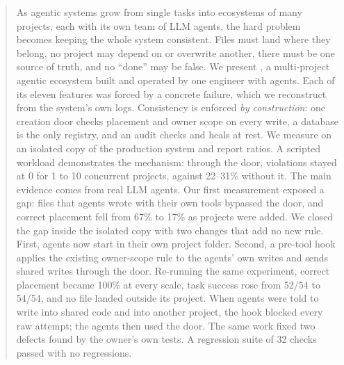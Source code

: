 \begin{abstract}
As agentic systems grow from single tasks into ecosystems of many projects, each with its own team of LLM agents, the hard problem becomes keeping the whole system consistent. Files must land where they belong, no project may depend on or overwrite another, there must be one source of truth, and no ``done'' may be false. We present \sys{}, a multi-project agentic ecosystem built and operated by one engineer with agents. Each of its eleven features was forced by a concrete failure, which we reconstruct from the system's own logs. Consistency is enforced \emph{by construction}: one creation door checks placement and owner scope on every write, a database is the only registry, and an audit checks and heals at rest. We measure on an isolated copy of the production system and report ratios. A scripted workload demonstrates the mechanism: through the door, violations stayed at 0 for 1 to 10 concurrent projects, against 22--31\% without it. The main evidence comes from real LLM agents. Our first measurement exposed a gap: files that agents wrote with their own tools bypassed the door, and correct placement fell from 67\% to 17\% as projects were added. We closed the gap inside the isolated copy with two changes that add no new rule. First, agents now start in their own project folder. Second, a pre-tool hook applies the existing owner-scope rule to the agents' own writes and sends shared writes through the door. Re-running the same experiment, correct placement became 100\% at every scale, task success rose from 52/54 to 54/54, and no file landed outside its project. When agents were told to write into shared code and into another project, the hook blocked every raw attempt; the agents then used the door. The same work fixed two defects found by the owner's own tests. A regression suite of 32 checks passed with no regressions.
\end{abstract}
